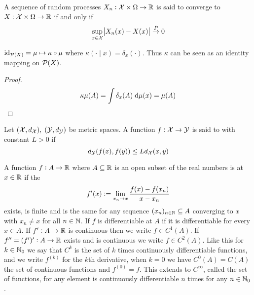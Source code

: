 \begin{defn} 
  A sequence of random processes $X_n: \mathcal{X} \times \Omega \to \mathbb{R}$
  is said to converge  to $X : \mathcal{X} \times \Omega \to \mathbb{R}$ if and only if
  \[ \sup_{x \in \mathcal{X}} \abs{X_n(x) - X(x)} \overset{P}{\to} 0 \]
\end{defn}

\begin{prop}
  $\text{id}_{\mathcal{P}(X)} = \mu \mapsto \kappa \circ \mu$
  where $\kappa(\cdot \mid x) = \delta_x(\cdot)$.
  Thus $\kappa$ can be seen as an identity mapping on $\mathcal{P}(X)$.
  \label{prop:identityKernel}
\end{prop}
\begin{proof}
  \[ \kappa \mu (A) = \int \delta_x(A) \; \mathrm{d} \mu(x) = \mu (A) \]
\end{proof}

\begin{defn}
  Let $(\mathcal{X}, d_\mathcal{X}), \; (\mathcal{Y}, d_\mathcal{Y})$ be metric spaces.
  A function $f: \mathcal{X} \to \mathcal{Y}$ is
  said to  with constant $L > 0$ if
  \[ d_\mathcal{Y}(f(x),f(y)) \leq L d_\mathcal{X}(x,y) \]
  \label{defn:Lipschitz}
\end{defn}

\begin{defn}
  A function $f : A \to \mathbb{R}$ where $A \subseteq \mathbb{R}$ is an open subset of the
  real numbers is 
  at $x \in \mathbb{R}$ if the 
  \[ f'(x) \vcentcolon= \lim_{x_n \to x} \frac{f(x) - f(x_n)}{x - x_n} \]
  exists, is finite and is the same for any sequence
  $(x_n)_{n \in \mathbb{N}} \subseteq A$
  converging to $x$
  with $x_n \neq x$ for all $n \in \mathbb{N}$.
  If $f$ is differentiable at $A$ if it is differentiable for every
  $x \in A$.
  If $f' : A \to \mathbb{R}$ is continuous then we write $f \in C^1(A)$.
  If $f'' = (f')' : A \to \mathbb{R}$ exists and is continuous we write
  $f \in C^2(A)$. Like this for $k \in \mathbb{N}_0$ we say that $C^k$
  is the set of $k$ times continuously
  differentiable functions, 
  and we write $f^{(k)}$ for the $k$th derivative,
  when $k=0$ we have $C^0(A) = C(A)$ the set of continuous functions and
  $f^{(0)} = f$.
  This extends to $C^\infty$, called the set of
   functions, for any element is continuously differentiable
  $n$ times for any $n \in \mathbb{N}_0$.
  \label{defn:diffR}
\end{defn}

